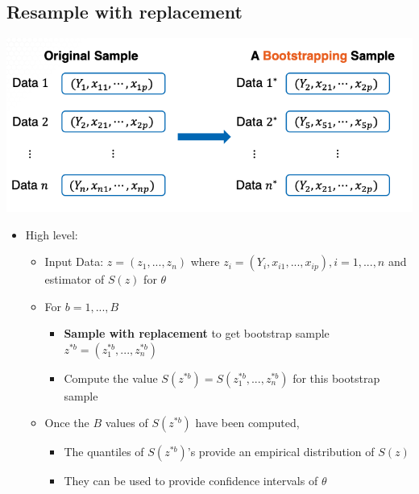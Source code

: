 \documentclass[11pt]{article}
\begin{document}
\subsection{Resample with replacement}
\label{sec:orgc71a823}
\begin{center}
\includegraphics[width=.9\linewidth]{./img/bootstrap-resample.png}
\end{center}
\begin{itemize}
\item High level:
\begin{itemize}
\item Input Data: \(z = (z_1, ..., z_n)\) where \(z_i = (Y_i, x_{i1}, ..., x_{ip}), i=1,...,n\) and estimator of \(S(z)\) for \(\theta\)
\item For \(b=1,...,B\)
\begin{itemize}
\item \textbf{\textbf{Sample with replacement}} to get bootstrap sample \(z^{*b} = (z_1^{*b}, ..., z_n^{*b})\)
\item Compute the value \(S(z^{*b}) = S(z_1^{*b}, ..., z_n^{*b})\) for this bootstrap sample
\end{itemize}
\item Once the \(B\) values of \(S(z^{*b})\) have been computed,
\begin{itemize}
\item The quantiles of \(S(z^{*b})\)'s provide an empirical distribution of \(S(z)\)
\item They can be used to provide confidence intervals of \(\theta\)
\end{itemize}
\end{itemize}
\end{itemize}
\end{document}
